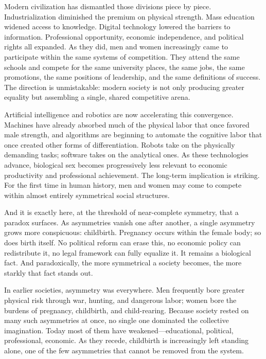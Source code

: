 \documentclass[12pt]{article}
\begin{document}
Modern civilization has dismantled those divisions piece by piece. Industrialization diminished the premium on physical strength. Mass education widened access to knowledge. Digital technology lowered the barriers to information. Professional opportunity, economic independence, and political rights all expanded. As they did, men and women increasingly came to participate within the same systems of competition. They attend the same schools and compete for the same university places, the same jobs, the same promotions, the same positions of leadership, and the same definitions of success. The direction is unmistakable: modern society is not only producing greater equality but assembling a single, shared competitive arena.

Artificial intelligence and robotics are now accelerating this convergence. Machines have already absorbed much of the physical labor that once favored male strength, and algorithms are beginning to automate the cognitive labor that once created other forms of differentiation. Robots take on the physically demanding tasks; software takes on the analytical ones. As these technologies advance, biological sex becomes progressively less relevant to economic productivity and professional achievement. The long-term implication is striking. For the first time in human history, men and women may come to compete within almost entirely symmetrical social structures.

And it is exactly here, at the threshold of near-complete symmetry, that a paradox surfaces. As asymmetries vanish one after another, a single asymmetry grows more conspicuous: childbirth. Pregnancy occurs within the female body; so does birth itself. No political reform can erase this, no economic policy can redistribute it, no legal framework can fully equalize it. It remains a biological fact. And paradoxically, the more symmetrical a society becomes, the more starkly that fact stands out.

In earlier societies, asymmetry was everywhere. Men frequently bore greater physical risk through war, hunting, and dangerous labor; women bore the burdens of pregnancy, childbirth, and child-rearing. Because society rested on many such asymmetries at once, no single one dominated the collective imagination. Today most of them have weakened—educational, political, professional, economic. As they recede, childbirth is increasingly left standing alone, one of the few asymmetries that cannot be removed from the system.
\end{document}
